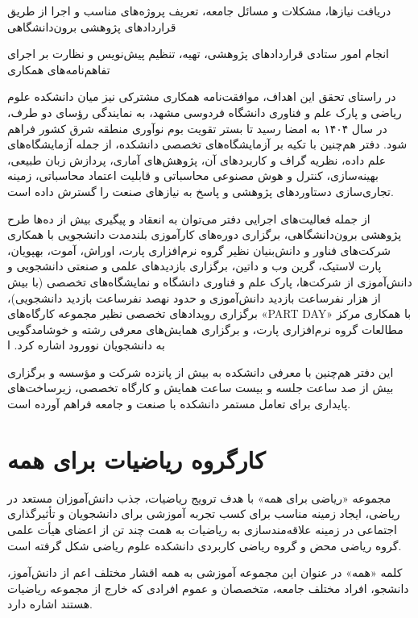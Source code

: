 \documentclass[
  letterpaper,
  DIV=11,
  numbers=noendperiod]{scrreprt}
\begin{document}
دریافت نیازها، مشکلات و مسائل جامعه، تعریف پروژه‌های مناسب و اجرا از طریق
قراردادهای پژوهشی برون‌دانشگاهی

انجام امور ستادی قراردادهای پژوهشی، تهیه، تنظیم پیش‌نویس و نظارت بر اجرای
تفاهم‌نامه‌های همکاری

در راستای تحقق این اهداف، موافقت‌نامه همکاری مشترکی نیز میان دانشکده علوم
ریاضی و پارک علم و فناوری دانشگاه فردوسی مشهد، به نمایندگی رؤسای دو طرف،
در سال ۱۴۰۴ به امضا رسید تا بستر تقویت بوم نوآوری منطقه شرق کشور فراهم
شود. دفتر هم‌چنین با تکیه بر آزمایشگاه‌های تخصصی دانشکده، از جمله
آزمایشگاه‌های علم داده، نظریه گراف و کاربردهای آن، پژوهش‌های آماری، پردازش
زبان طبیعی، بهینه‌سازی، کنترل و هوش مصنوعی محاسباتی و قابلیت اعتماد
محاسباتی، زمینه تجاری‌سازی دستاوردهای پژوهشی و پاسخ به نیازهای صنعت را
گسترش داده است.

از جمله فعالیت‌های اجرایی دفتر می‌توان به انعقاد و پیگیری بیش از ده‌ها طرح
پژوهشی برون‌دانشگاهی، برگزاری دوره‌های کارآموزی بلندمدت دانشجویی با همکاری
شرکت‌های فناور و دانش‌بنیان نظیر گروه نرم‌افزاری پارت، اوراش، آموت،
بهپویان، پارت لاستیک، گرین وب و داتین، برگزاری بازدیدهای علمی و صنعتی
دانشجویی و دانش‌آموزی از شرکت‌ها، پارک علم و فناوری دانشگاه و نمایشگاه‌های
تخصصی (با بیش از هزار نفر‌ساعت بازدید دانش‌آموزی و حدود نهصد نفر‌ساعت
بازدید دانشجویی)، برگزاری رویدادهای تخصصی نظیر مجموعه کارگاه‌های «PART
DAY» با همکاری مرکز مطالعات گروه نرم‌افزاری پارت، و برگزاری همایش‌های
معرفی رشته و خوشامدگویی به دانشجویان نوورود اشاره کرد. ا

این دفتر هم‌چنین با معرفی دانشکده به بیش از پانزده شرکت و مؤسسه و برگزاری
بیش از صد ساعت جلسه و بیست ساعت همایش و کارگاه تخصصی، زیرساخت‌های پایداری
برای تعامل مستمر دانشکده با صنعت و جامعه فراهم آورده است.

\section{کارگروه ریاضیات برای
همه}\label{ux6a9ux627ux631ux6afux631ux648ux647-ux631ux6ccux627ux636ux6ccux627ux62a-ux628ux631ux627ux6cc-ux647ux645ux647}

مجموعه «ریاضی برای همه» با هدف ترویج ریاضیات، جذب دانش‌آموزان مستعد در
ریاضی، ایجاد زمینه مناسب برای کسب تجربه آموزشی برای دانشجویان و
تأثیرگذاری اجتماعی در زمینه علاقه‌مندسازی به ریاضیات به همت چند تن از
اعضای هیأت علمی گروه ریاضی محض و گروه ریاضی کاربردی دانشکده علوم ریاضی
شکل گرفته است.

کلمه «همه» در عنوان این مجموعه آموزشی به همه اقشار مختلف اعم از
دانش‌آموز، دانشجو، افراد مختلف جامعه، متخصصان و عموم افرادی که خارج از
مجموعه ریاضیات هستند اشاره دارد.
\end{document}
